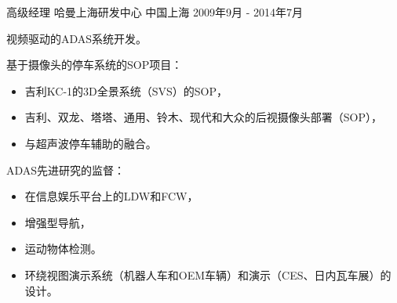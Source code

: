\documentclass[../cv_xin_cn.tex]{subfiles}
\begin{document}
\begin{cventries}
  \cventry
    {高级经理} %
    {哈曼上海研发中心} %
    {中国上海} %
    {2009年9月 - 2014年7月} %
    {
      \begin{cvitems}
        \item 视频驱动的ADAS系统开发。
        \item 基于摄像头的停车系统的SOP项目：
          \begin{itemize}
            \item 吉利KC-1的3D全景系统（SVS）的SOP，
            \item 吉利、双龙、塔塔、通用、铃木、现代和大众的后视摄像头部署（SOP），
            \item 与超声波停车辅助的融合。
           \end{itemize}
        \item ADAS先进研究的监督：
          \begin{itemize}
            \item 在信息娱乐平台上的LDW和FCW，
            \item 增强型导航，
            \item 运动物体检测。
            \item 环绕视图演示系统（机器人车和OEM车辆）和演示（CES、日内瓦车展）的设计。
          \end{itemize}
      \end{cvitems}
    }
\end{cventries}
\end{document}
